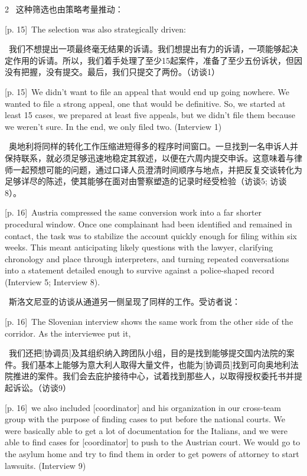 \documentclass[10pt,a4paper]{article}
\begin{document}
\begin{paracol}{2}
\switchcolumn*
{\scriptsize\color{gray} [p. 15]}\ 这种筛选也由策略考量推动：\par
\switchcolumn
{\scriptsize\color{gray} [p. 15]}\ The selection was also strategically driven:\par
\switchcolumn*
{\scriptsize\color{gray} [p. 15]}\ 我们不想提出一项最终毫无结果的诉请。我们想提出有力的诉请，一项能够起决定作用的诉请。所以，我们着手处理了至少15起案件，准备了至少五份诉状，但因没有把握，没有提交。最后，我们只提交了两份。（访谈1）\par
\switchcolumn
{\scriptsize\color{gray} [p. 15]}\ We didn’t want to file an appeal that would end up going nowhere. We wanted to file a strong appeal, one that would be definitive. So, we started at least 15 cases, we prepared at least five appeals, but we didn’t file them because we weren’t sure. In the end, we only filed two. (Interview 1)\par
\switchcolumn*
{\scriptsize\color{gray} [p. 16]}\ 奥地利将同样的转化工作压缩进短得多的程序时间窗口。一旦找到一名申诉人并保持联系，就必须足够迅速地稳定其叙述，以便在六周内提交申诉。这意味着与律师一起预想可能的问题，通过口译人员澄清时间顺序与地点，并把反复交谈转化为足够详尽的陈述，使其能够在面对由警察塑造的记录时经受检验（访谈5; 访谈8）。\par
\switchcolumn
{\scriptsize\color{gray} [p. 16]}\ Austria compressed the same conversion work into a far shorter procedural window. Once one complainant had been identified and remained in contact, the task was to stabilize the account quickly enough for filing within six weeks. This meant anticipating likely questions with the lawyer, clarifying chronology and place through interpreters, and turning repeated conversations into a statement detailed enough to survive against a police-shaped record (Interview 5; Interview 8).\par
\switchcolumn*
{\scriptsize\color{gray} [p. 16]}\ 斯洛文尼亚的访谈从通道另一侧呈现了同样的工作。受访者说：\par
\switchcolumn
{\scriptsize\color{gray} [p. 16]}\ The Slovenian interview shows the same work from the other side of the corridor. As the interviewee put it,\par
\switchcolumn*
{\scriptsize\color{gray} [p. 16]}\ 我们还把[协调员]及其组织纳入跨团队小组，目的是找到能够提交国内法院的案件。我们基本上能够为意大利人取得大量文件，也能为[协调员]找到可向奥地利法院推进的案件。我们会去庇护接待中心，试着找到那些人，以取得授权委托书并提起诉讼。（访谈9）\par
\switchcolumn
{\scriptsize\color{gray} [p. 16]}\ we also included [coordinator] and his organization in our cross-team group with the purpose of finding cases to put before the national courts. We were basically able to get a lot of documentation for the Italians, and we were able to find cases for [coordinator] to push to the Austrian court. We would go to the asylum home and try to find them in order to get powers of attorney to start lawsuits. (Interview 9)\par

\end{paracol}
\end{document}
